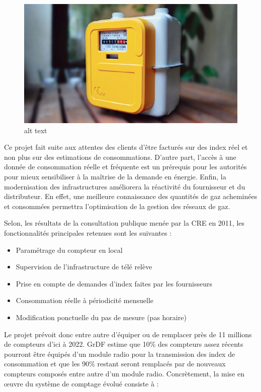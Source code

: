 \documentclass[
12pt,
french,                           %
a4paper,
]{article}
\begin{document}
\begin{figure}[htbp]
\centering
\includegraphics{compteurgazpar.png}
\caption{alt text}
\end{figure}

Ce projet fait suite aux attentes des clients d'être facturés sur des
index réel et non plus sur des estimations de consommations. D'autre
part, l'accès à une donnée de consommation réelle et fréquente est un
prérequis pour les autorités pour mieux sensibiliser à la maîtrise de la
demande en énergie. Enfin, la modernisation des infrastructures
améliorera la réactivité du fournisseur et du distributeur. En effet,
une meilleure connaissance des quantités de gaz acheminées et consommées
permettra l'optimisation de la gestion des réseaux de gaz.

Selon, les résultats de la consultation publique menée par la CRE en
2011, les fonctionnalités principales retenues sont les suivantes :

\begin{itemize}
\item
  Paramétrage du compteur en local
\item
  Supervision de l'infrastructure de télé relève
\item
  Prise en compte de demandes d'index faites par les fournisseurs
\item
  Consommation réelle à périodicité mensuelle
\item
  Modification ponctuelle du pas de mesure (pas horaire)
\end{itemize}

Le projet prévoit donc entre autre d'équiper ou de remplacer près de 11
millions de compteurs d'ici à 2022. GrDF estime que 10\% des compteurs
assez récents pourront être équipés d'un module radio pour la
transmission des index de consommation et que les 90\% restant seront
remplacés par de nouveaux compteurs composés entre autre d'un module
radio. Concrètement, la mise en œuvre du système de comptage évolué
consiste à :
\end{document}
